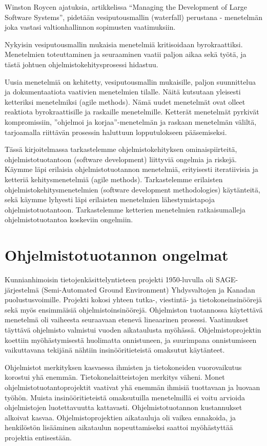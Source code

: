 \documentclass[finnish]{tktltiki2}
\theoremstyle{definition}
\theoremstyle{remark}
\begin{document}
Winston Roycen ajatuksia, artikkelissa “Managing the Development of Large Software Systems”, pidetään vesiputousmallin (waterfall) perustana - menetelmän joka vastasi valtionhallinnon sopimusten vaatimuksiin\cite{LAB03}.

Nykyisin vesiputousmallin mukaisia menetelmiä kritisoidaan byrokraattiksi. Menetelmien toteuttaminen ja seuraaminen vaatii paljon aikaa sekä työtä, ja tästä johtuen ohjelmistokehitysprosessi hidastuu\cite{FOW01a}.

Uusia menetelmiä on kehitetty, vesiputousmallin mukaisille, paljon suunnittelua ja dokumentaatiota vaativien menetelmien tilalle. Näitä kutsutaan yleisesti ketteriksi menetelmiksi (agile methods). Nämä uudet menetelmät ovat olleet reaktiota byrokraattisille ja raskaille menetelmille. Ketterät menetelmät pyrkivät kompromissiin, ''ohjelmoi ja korjaa''-menetelmän ja raskaan menetelmän väliltä, tarjoamalla riittävän prosessin haluttuun lopputulokseen pääsemiseksi\cite{FOW01a}.

Tässä kirjoitelmassa tarkastelemme ohjelmistokehityksen ominaispiirteitä, ohjelmistotuotantoon (software develop\-ment) liittyviä ongelmia ja riskejä. Käymme läpi erilaisia ohjelmistotuotannon menetelmiä, erityisesti iteratiivisia ja ketteriä kehitysmenetelmiä (agile methods). Tarkastelemme erilaisten ohjelmistokehitysmenetelmien (software develop\-ment methodologies) käytänteitä, sekä käymme lyhyesti läpi erilaisten menetelmien lähestymistapoja ohjelmistotuotantoon. Tarkastelemme ketterien menetelmien ratkaisumalleja ohjelmistotuotantoa koskeviin ongelmiin. 

\section{Ohjelmistotuotannon ongelmat}

Kunnianhimoisin tietojenkäsittelyntieteen projekti 1950-luvulla oli SAGE-järjestelmä (Semi-Automated Ground Environment) Yhdysvaltojen ja Kanadan puolustusvoimille. Projekti kokosi yhteen tutka-, viestintä- ja tietokoneinsinöörejä sekä myös ensimmäisiä ohjelmistoinsinöörejä. Ohjelmiston tuotannossa käytettävä menetelmä oli vaiheesta seuraavaan etenevä lineaarinen prosessi. Vaatimukset täyttävä ohjelmisto valmistui vuoden aikataulusta myöhässä. Ohjelmistoprojektin koettiin myöhästymisestä huolimatta onnistuneen, ja suurimpana onnistumiseen vaikuttavana tekijänä nähtiin insinööritieteistä omaksutut käytänteet\cite{BOE06}.

Ohjelmistot merkityksen kasvaessa ihmisten ja tietokoneiden vuorovaikutus korostui yhä enemmän. Tietokonelaitteistojen merkitys väheni. Monet ohjelmistotuotantoprojektit vaativat yhä enemmän ihmisiä tuottavaan ja luovaan työhön. Muista insinööritieteistä omaksutuilla menetelmillä ei voitu arvioida ohjelmistojen luotettavuutta kattavasti. Ohjelmistotuotannon kustannukset alkoivat kasvaa. Ohjelmistoprojektien aikatauluja oli vaikea ennakoida, ja henkilöstön lisääminen aikataulun nopeuttamiseksi saattoi myöhästyttää projektia entisestään\cite{BOE06}.
\end{document}
